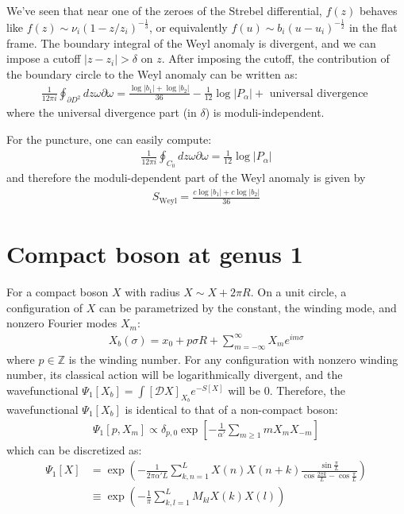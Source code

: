 \documentclass[12pt,letterpaper]{article}
\def\ie{\begin{equation}\begin{aligned}}
\def\fe{\end{aligned}\end{equation}}
\numberwithin{equation}{section}
\begin{document}
We've seen that near one of the zeroes of the Strebel differential, $f(z)$ behaves like $f(z)\sim \nu_i (1-z/z_i)^{-\frac{1}{3}}$, or equivalently $f(u)\sim b_i(u-u_i)^{-\frac{1}{2}}$ in the flat frame. The boundary integral of the Weyl anomaly is divergent, and we can impose a cutoff $|z-z_i|>\delta$ on $z$. After imposing the cutoff, the contribution of the boundary circle to the Weyl anomaly can be written as:
\ie
\frac{1}{12\pi i}\oint_{\partial D^2}dz \omega \partial \omega = \frac{\log |b_1|+\log|b_2|}{36}-\frac{1}{12}\log |P_\alpha|+\text{ universal divergence }
\fe
where the universal divergence part (in $\delta$) is moduli-independent.

For the puncture, one can easily compute:
\ie
\frac{1}{12\pi i}\oint_{C_0} dz \omega \partial \omega = \frac{1}{12}\log |P_\alpha|
\fe
and therefore the moduli-dependent part of the Weyl anomaly is given by
\ie
S_\text{Weyl} = \frac{c\log |b_1|+c\log |b_2|}{36}
\fe

\section{Compact boson at genus 1}

For a compact boson $X$ with radius $X\sim X+2\pi R$. On a unit circle, a configuration of $X$ can be parametrized by the constant, the winding mode, and nonzero Fourier modes $X_m$:
\ie
X_b(\sigma)=x_0+ p \sigma R+\sum_{m=-\infty}^\infty X_m e^{im\sigma}
\fe
where $p\in\mathbb{Z}$ is the winding number. For any configuration with nonzero winding number, its classical action will be logarithmically divergent, and the wavefunctional $\Psi_1[X_b]=\int [\mathcal{D}X]_{X_b}e^{-S[X]}$ will be 0. Therefore, the wavefunctional $\Psi_1[X_b]$ is identical to that of a non-compact boson:
\ie
\Psi_1[p,X_m]\propto \delta_{p,0}\exp\left[-\frac{1}{\alpha'}\sum_{m\geq 1}mX_m X_{-m}\right]
\fe
which can be discretized as:
\ie
\Psi_1[X]&=\exp\left(-\frac{1}{2\pi \alpha' L}\sum_{k,n=1}^L X(n)X(n+k)\frac{\sin \frac{\pi}{L}}{\cos \frac{2\pi k}{L}-\cos \frac{\pi}{L}}\right)\\
&\equiv \exp\left(-\frac{1}{\pi}\sum_{k,l=1}^L M_{kl}X(k)X(l)\right)
\fe
\end{document}
